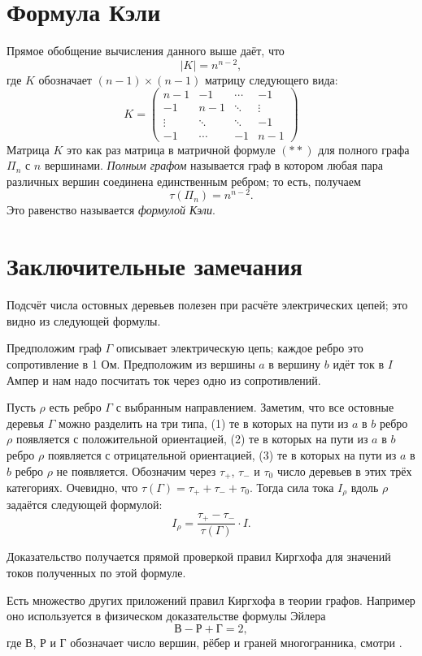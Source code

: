 \documentclass{article}
\begin{document}
\section{Формула Кэли}

Прямое обобщение вычисления данного выше даёт, что
\[|K|=n^{n-2},\]
где $K$ обозначает $(n-1)\times (n-1)$ матрицу следующего вида:
\[
K=\left(
\begin{matrix}
n{-}1&-1&\cdots&-1
\\
-1&n{-}1&\ddots&\vdots
\\
\vdots&\ddots&\ddots&-1
\\
-1&\cdots&-1&n{-}1
\end{matrix}
\right)
\]
Матрица $K$ это как раз матрица в матричной формуле $({*}{*})$ для полного графа $\Pi_n$ с $n$ вершинами.
\emph{Полным графом} называется граф в котором любая пара различных вершин соединена единственным ребром; то есть, получаем 
\[\tau(\Pi_n)=n^{n-2}.\]
Это равенство называется \emph{формулой Кэли}.


\section{Заключительные замечания}

Подсчёт числа остовных деревьев полезен при расчёте электрических цепей;
это видно из следующей формулы.

Предположим граф $\Gamma$ описывает электрическую цепь;
каждое ребро это сопротивление в 1 Ом.
Предположим из вершины $a$ в вершину $b$ идёт ток в $I$ Ампер и нам надо посчитать ток через одно из сопротивлений.

Пусть $\rho$ есть ребро $\Gamma$ с выбранным направлением.
Заметим, что все остовные деревья $\Gamma$ можно разделить на три типа,
(1) те в которых на пути из $a$ в $b$ ребро $\rho$ появляется с положительной ориентацией,
(2) те в которых на пути из $a$ в $b$ ребро $\rho$ появляется с отрицательной ориентацией,
(3) те в которых на пути из $a$ в $b$ ребро $\rho$ не появляется.
Обозначим через $\tau_+$, $\tau_-$ и $\tau_0$ число деревьев в этих трёх категориях.
Очевидно, что $\tau(\Gamma)=\tau_++\tau_-+\tau_0$.
Тогда сила тока $I_\rho$ вдоль $\rho$ задаётся следующей формулой:
\[I_\rho=\frac{\tau_+-\tau_-}{\tau(\Gamma)}\cdot I.\]

Доказательство получается прямой проверкой правил Киргхофа для значений токов полученных по этой формуле.

Есть множество других приложений правил Киргхофа в теории графов. 
Например оно используется в физическом доказательстве формулы Эйлера
\[\text{В}-\text{Р}+\text{Г}=2,\]
где $\text{В}$, $\text{Р}$ и $\text{Г}$ обозначает число вершин, рёбер и граней многогранника,
смотри \cite{levi}.
\end{document}
